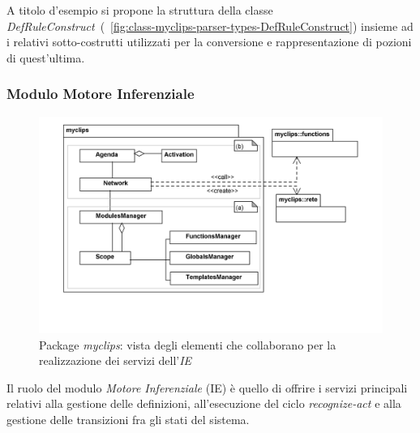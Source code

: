 


A titolo d'esempio si propone la struttura della classe \emph{DefRuleConstruct}~(\figurename~\ref{fig:class-myclips-parser-types-DefRuleConstruct})  insieme ad i relativi sotto-costrutti utilizzati per la conversione e rappresentazione di pozioni di quest'ultima.


\subsubsection{Modulo Motore Inferenziale}

\begin{figure}[h]
\centering
\includegraphics[width=1\textwidth]{Immagini/Capitolo3/Packages/IE.png}
\caption{Package \emph{myclips}: vista degli elementi che collaborano per la realizzazione dei servizi dell'\emph{IE}}\label{fig:packages-ie}
\end{figure}

Il ruolo del modulo \emph{Motore Inferenziale} (IE) è quello di offrire i servizi principali relativi alla gestione delle definizioni, all'esecuzione del ciclo \emph{recognize-act} e alla gestione delle transizioni fra gli stati del sistema.

